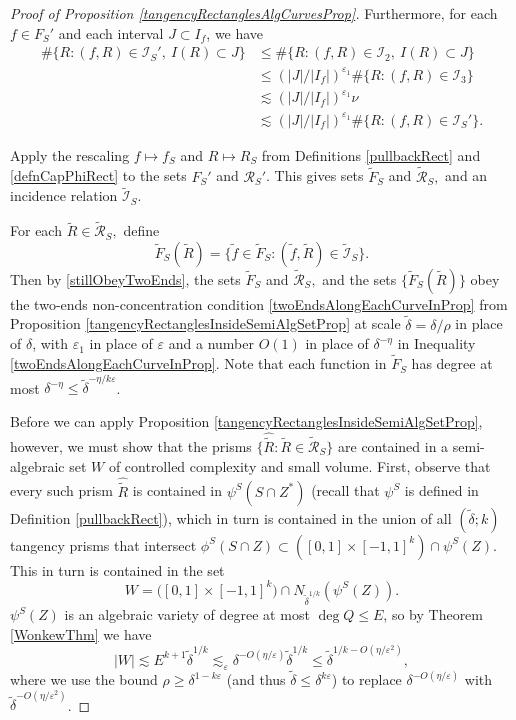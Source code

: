 \documentclass[letterpaper, reqno,11pt]{article}
\numberwithin{equation}{section}
\newcommand{\eps}{\varepsilon}
\numberwithin{thm}{section}
\theoremstyle{remark}
\begin{document}
\begin{proof}[Proof of Proposition \ref{tangencyRectanglesAlgCurvesProp}]
Furthermore, for each $f\in F_S'$ and each interval $J\subset I_f$, we have
\begin{equation}\label{stillObeyTwoEnds}
\begin{split}
\#\{R\colon (f,R)\in\mathcal{I}_S',\ I(R)\subset J\} &\leq  \# \{R  \colon (f,R)\in \mathcal{I}_2,\  I(R)\subset J\}\\
& \leq (|J|/|I_f|)^{\eps_1} \# \{R\colon (f,R)\in \mathcal{I}_3\}\\
& \lesssim (|J|/|I_f|)^{\eps_1} \nu\\
& \lesssim (|J|/|I_f|)^{\eps_1} \#\{R\colon (f,R)\in\mathcal{I}_S'\}.
\end{split}
\end{equation}


Apply the rescaling $f\mapsto f_S$ and $R\mapsto R_S$ from Definitions \ref{pullbackRect} and \ref{defnCapPhiRect} to the sets $F_S'$ and $\mathcal{R}_S'$. This gives sets $\tilde F_S$ and $\tilde{\mathcal{R}}_S,$ and an incidence relation $\tilde{\mathcal{I}}_S$.

For each $\tilde R\in \tilde{\mathcal{R}}_S,$ define 
\[
\tilde F_S(\tilde R)=\{\tilde f\in \tilde F_S\colon (\tilde f,\tilde R)\in \tilde{\mathcal{I}}_S \}.
\]
Then by \eqref{stillObeyTwoEnds}, the sets $\tilde F_S$ and $\tilde{\mathcal{R}}_S,$ and the sets $\{\tilde F_S(\tilde R)\}$ obey the two-ends non-concentration condition \eqref{twoEndsAlongEachCurveInProp} from Proposition \ref{tangencyRectanglesInsideSemiAlgSetProp} at scale $\tilde\delta=\delta/\rho$ in place of $\delta$, with $\eps_1$ in place of $\eps$ and a number $O(1)$ in place of $\delta^{-\eta}$ in Inequality \eqref{twoEndsAlongEachCurveInProp}. Note that each function in $\tilde F_S$ has degree at most $\delta^{-\eta}\leq \tilde\delta^{-\eta/k\eps}$.



%
Before we can apply Proposition \ref{tangencyRectanglesInsideSemiAlgSetProp}, however, we must show that the prisms $\{\hat{\tilde R}\colon \tilde R\in\tilde{\mathcal{R}}_S\}$  are contained in a semi-algebraic set $W$ of controlled complexity and small volume. 
%
First, observe that every such prism $\hat{\tilde R}$ is contained in $\psi^S(S\cap Z^*)$ (recall that $\psi^S$ is defined in Definition \ref{pullbackRect}), which in turn is contained in the union of all $(\tilde\delta;k)$ tangency prisms that intersect $\phi^S(S\cap Z)\subset ([0,1]\times[-1,1]^k) \cap \psi^S(Z)$. This in turn is contained in the set 
\[
W=\big([0,1]\times[-1,1]^k\big) \cap N_{\tilde\delta^{1/k}}(\psi^S(Z)).
\] 
$\psi^S(Z)$ is an algebraic variety of degree at most $\deg Q\leq E$, so by Theorem \ref{WonkewThm} we have
\[
|W| \lesssim E^{k+1}\tilde\delta^{1/k} \lesssim_\eps  \delta^{-O(\eta/\eps)}\tilde\delta^{1/k} \leq \tilde\delta^{1/k-O(\eta/\eps^2)},
\]
where we use the bound $\rho\geq\delta^{1-k\eps}$ (and thus $\tilde\delta\leq \delta^{k\eps}$) to replace $\delta^{-O(\eta/\eps)}$ with $\tilde\delta^{-O(\eta/\eps^2)}$.



\end{proof}
\end{document}
